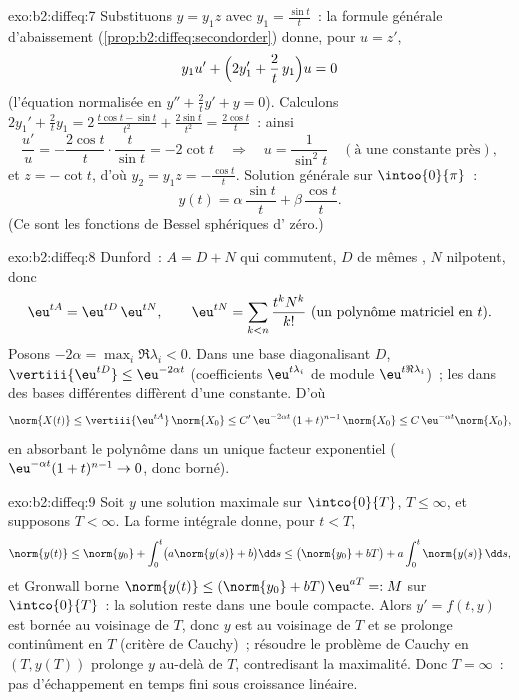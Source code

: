 \begin{solution}{exo:b2:diffeq:7}
Substituons $y = y_1 z$ avec $y_1 = \frac{\sin t}{t}$~: la formule
générale d'abaissement (\cref{prop:b2:diffeq:secondorder}) donne,
pour $u = z'$,
\[
y_1 u' + \Bigl(2y_1' + \frac{2}{t}\,y_1\Bigr)u = 0
\]
(l'équation normalisée en $y'' + \frac2t y' + y = 0$). Calculons
$2y_1' + \frac2t y_1 = 2\,\frac{t\cos t - \sin t}{t^2} +
\frac{2\sin t}{t^2} = \frac{2\cos t}{t}$~: ainsi
\[
\frac{u'}{u} = -\frac{2\cos t}{t}\cdot\frac{t}{\sin t}
= -2\cot t
\quad\Longrightarrow\quad
u = \frac{1}{\sin^2 t}
\quad (\text{à une constante près}),
\]
et $z = -\cot t$, d'où $y_2 = y_1 z = -\frac{\cos t}{t}$.
Solution générale sur $\intoo{0}{\pi}$~:
\[
y(t) = \alpha\,\frac{\sin t}{t} + \beta\,\frac{\cos t}{t} .
\]
(Ce sont les fonctions de Bessel sphériques d' zéro.)
\end{solution}

\begin{solution}{exo:b2:diffeq:8}
Dunford~: $A = D + N$ qui commutent, $D$  de mêmes
, $N$ nilpotent, donc
\[
\eu^{tA} = \eu^{tD}\,\eu^{tN},
\qquad
\eu^{tN} = \sum_{k < n} \frac{t^kN^k}{k!}
\ \text{(un polynôme matriciel en } t).
\]
Posons $-2\alpha = \max_i \Re\lambda_i < 0$. Dans une base
diagonalisant $D$, $\vertiii{\eu^{tD}} \leq \eu^{-2\alpha t}$
(coefficients $\eu^{t\lambda_i}$ de module $\eu^{t\Re\lambda_i}$)~;
les  dans des bases différentes diffèrent d'une constante.
D'où
\[
\norm{X(t)} \leq \vertiii{\eu^{tA}}\,\norm{X_0}
\leq C'\,\eu^{-2\alpha t}\,(1 + t)^{n-1}\,\norm{X_0}
\leq C\,\eu^{-\alpha t}\norm{X_0} ,
\]
en absorbant le polynôme dans un unique facteur exponentiel
($\eu^{-\alpha t}(1+t)^{n-1} \to 0$, donc borné).
\end{solution}

\begin{solution}{exo:b2:diffeq:9}
Soit $y$ une solution maximale sur $\intco{0}{T}$, $T \leq \infty$,
et supposons $T < \infty$. La forme intégrale donne, pour $t < T$,
\[
\norm{y(t)} \leq \norm{y_0} + \int_0^t \bigl(a\norm{y(s)} +
b\bigr)\dd s
\leq \bigl(\norm{y_0} + bT\bigr) + a\int_0^t\norm{y(s)}\,\dd s ,
\]
et Gronwall borne $\norm{y(t)} \leq (\norm{y_0} +
bT)\,\eu^{aT} =: M$ sur $\intco{0}{T}$~: la solution reste dans une
boule compacte. Alors $y' = f(t, y)$ est bornée au voisinage de
$T$, donc $y$ est  au voisinage de $T$ et se prolonge
continûment en $T$ (critère de Cauchy)~; résoudre le problème de
Cauchy en $(T, y(T))$ prolonge $y$ au-delà de $T$, contredisant la
maximalité. Donc $T = \infty$~: pas d'échappement en temps fini
sous croissance linéaire.
\end{solution}

